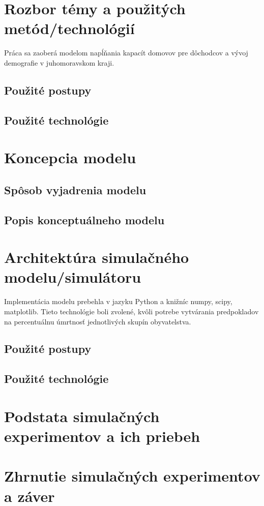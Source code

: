 \documentclass[a4paper, 11pt]{article}
\begin{document}
    \section{Rozbor témy a použitých metód/technológií}
    Práca sa zaoberá modelom napĺňania kapacít domovov pre dôchodcov a vývoj demografie v juhomoravskom kraji.
    \subsection{Použité postupy}
    \subsection{Použité technológie}
    
    
    \section{Koncepcia modelu}
    \subsection{Spôsob vyjadrenia modelu}
    \subsection{Popis konceptuálneho modelu}
    
    
    \section{Architektúra simulačného modelu/simulátoru}
    Implementácia modelu prebehla v jazyku Python a knižníc numpy, scipy, matplotlib. Tieto technológie boli zvolené, kvôli potrebe vytvárania predpokladov na percentuálnu úmrtnosť jednotlivých skupín obyvatelstva.
    \subsection{Použité postupy}
    \subsection{Použité technológie}
    
    
    \section{Podstata simulačných experimentov a ich priebeh}
    
    \section{Zhrnutie simulačných experimentov a záver}
    
\end{document}
